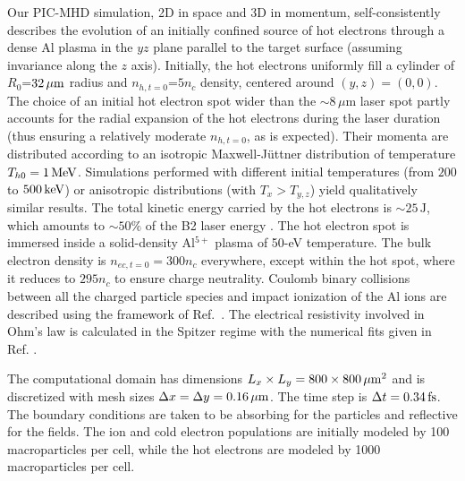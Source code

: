 \documentclass[aps,twocolumn,showpacs,superscriptaddress]{revtex4}
\begin{document}
Our PIC-MHD simulation, 2D in space and 3D in momentum, self-consistently describes the evolution of an initially confined source of hot electrons through a dense Al plasma in the $yz$ plane parallel to the target surface (assuming invariance along the $z$ axis). Initially, the hot electrons uniformly fill a cylinder of
$R_{0}$=$32\,\rm \mu m$ radius and $n_{h,t=0}$=$5n_c$ density, centered around $(y,z)=(0,0)$. The choice of an initial hot electron spot wider than the $\sim 8\,\mu\mathrm{m}$ laser spot partly accounts for the radial expansion of the hot electrons during the laser duration \cite{PRE_Stephens_2004} (thus ensuring a relatively moderate $n_{h,t=0}$, as is expected). Their momenta are distributed according to an isotropic Maxwell-J\"uttner distribution of temperature $T_{h0}=1\,\rm MeV$. Simulations performed with different initial temperatures (from $200$ to $500\,\rm keV$) or anisotropic distributions (with $T_x>T_{y,z}$) yield qualitatively similar results. The total kinetic energy carried by the hot electrons is $\sim 25\,\mathrm{J}$, which amounts to $\sim 50\%$ of the B2 laser energy \cite{PRL_Ping_2008}. The hot electron spot is immersed inside a solid-density Al$^{5+}$ plasma of \mbox{50-eV} temperature. The bulk electron density is $n_{ec,t=0}=300n_c$ everywhere, except within the hot spot, where it reduces to $295n_c$ to ensure charge neutrality. Coulomb binary collisions between all the charged particle species and impact ionization of the Al ions are described using the framework of \mbox{Ref.~\cite{POP_Perez_2012}}. The electrical resistivity involved in Ohm's law is calculated in the Spitzer regime with the numerical fits given in Ref. \cite{Decoster_1998}. 
%

The computational domain has dimensions
$L_x\times L_y=800 \times 800\,\rm \mu m^2$ and is discretized with mesh sizes $\Delta x=\Delta y =0.16\,\rm \mu m$. The time step is $\Delta t=0.34\,\rm fs$. The boundary conditions are taken to be absorbing for the particles and reflective for the fields. The ion and cold electron populations are initially modeled by 100 macroparticles per cell, while the hot electrons are modeled by 1000 macroparticles per cell.
\end{document}
